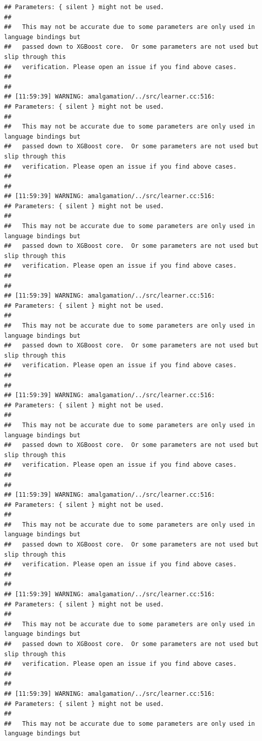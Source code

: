\documentclass[AMS,STIX2COL]{WileyNJD-v2}\usepackage[]{graphicx}\usepackage[]{color}
\makeatletter
\newenvironment{kframe}{%
 \def\at@end@of@kframe{}%
 \ifinner\ifhmode%
  \def\at@end@of@kframe{\end{minipage}}%
  \begin{minipage}{\columnwidth}%
 \fi\fi%
 \def\FrameCommand##1{\hskip\@totalleftmargin \hskip-\fboxsep
 \colorbox{shadecolor}{##1}\hskip-\fboxsep
     \hskip-\linewidth \hskip-\@totalleftmargin \hskip\columnwidth}%
 \MakeFramed {\advance\hsize-\width
   \@totalleftmargin\z@ \linewidth\hsize
   \@setminipage}}%
 {\par\unskip\endMakeFramed%
 \at@end@of@kframe}
\newenvironment{knitrout}{}{} %
\makeatother
\begin{document}
\begin{knitrout}
\begin{kframe}
\begin{verbatim}
## Parameters: { silent } might not be used.
## 
##   This may not be accurate due to some parameters are only used in language bindings but
##   passed down to XGBoost core.  Or some parameters are not used but slip through this
##   verification. Please open an issue if you find above cases.
## 
## 
## [11:59:39] WARNING: amalgamation/../src/learner.cc:516: 
## Parameters: { silent } might not be used.
## 
##   This may not be accurate due to some parameters are only used in language bindings but
##   passed down to XGBoost core.  Or some parameters are not used but slip through this
##   verification. Please open an issue if you find above cases.
## 
## 
## [11:59:39] WARNING: amalgamation/../src/learner.cc:516: 
## Parameters: { silent } might not be used.
## 
##   This may not be accurate due to some parameters are only used in language bindings but
##   passed down to XGBoost core.  Or some parameters are not used but slip through this
##   verification. Please open an issue if you find above cases.
## 
## 
## [11:59:39] WARNING: amalgamation/../src/learner.cc:516: 
## Parameters: { silent } might not be used.
## 
##   This may not be accurate due to some parameters are only used in language bindings but
##   passed down to XGBoost core.  Or some parameters are not used but slip through this
##   verification. Please open an issue if you find above cases.
## 
## 
## [11:59:39] WARNING: amalgamation/../src/learner.cc:516: 
## Parameters: { silent } might not be used.
## 
##   This may not be accurate due to some parameters are only used in language bindings but
##   passed down to XGBoost core.  Or some parameters are not used but slip through this
##   verification. Please open an issue if you find above cases.
## 
## 
## [11:59:39] WARNING: amalgamation/../src/learner.cc:516: 
## Parameters: { silent } might not be used.
## 
##   This may not be accurate due to some parameters are only used in language bindings but
##   passed down to XGBoost core.  Or some parameters are not used but slip through this
##   verification. Please open an issue if you find above cases.
## 
## 
## [11:59:39] WARNING: amalgamation/../src/learner.cc:516: 
## Parameters: { silent } might not be used.
## 
##   This may not be accurate due to some parameters are only used in language bindings but
##   passed down to XGBoost core.  Or some parameters are not used but slip through this
##   verification. Please open an issue if you find above cases.
## 
## 
## [11:59:39] WARNING: amalgamation/../src/learner.cc:516: 
## Parameters: { silent } might not be used.
## 
##   This may not be accurate due to some parameters are only used in language bindings but

\end{verbatim}
\end{kframe}
\end{knitrout}
\end{document}
